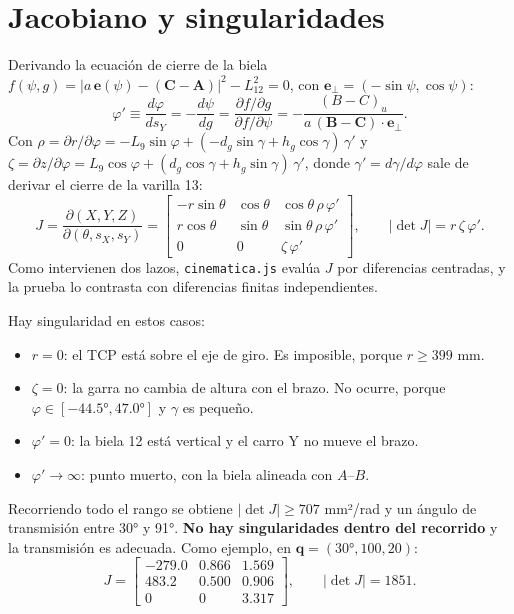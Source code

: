 \documentclass[a4paper,12pt]{article}
\newcommand{\codigo}[1]{\texttt{\small #1}}
\begin{document}
\section{Jacobiano y singularidades}

Derivando la ecuación de cierre de la biela $f(\psi, g) = |a\,\mathbf{e}(\psi) - (\mathbf{C}-\mathbf{A})|^2 - L_{12}^2 = 0$,
con $\mathbf{e}_\perp = (-\sin\psi, \cos\psi)$:
\begin{equation}
\varphi' \equiv \frac{d\varphi}{ds_Y} = -\frac{d\psi}{dg} = \frac{\partial f/\partial g}{\partial f/\partial\psi}
= -\frac{(B-C)_u}{a\,(\mathbf{B}-\mathbf{C})\cdot\mathbf{e}_\perp}.
\end{equation}
Con $\rho = \partial r/\partial\varphi = -L_9\sin\varphi + (-d_g\sin\gamma + h_g\cos\gamma)\,\gamma'$ y
$\zeta = \partial z/\partial\varphi = L_9\cos\varphi + (d_g\cos\gamma + h_g\sin\gamma)\,\gamma'$, donde
$\gamma' = d\gamma/d\varphi$ sale de derivar el cierre de la varilla 13:
\begin{equation}
J = \frac{\partial(X,Y,Z)}{\partial(\theta, s_X, s_Y)} =
\begin{bmatrix}
-r\sin\theta & \cos\theta & \cos\theta\, \rho\,\varphi'\\
 r\cos\theta & \sin\theta & \sin\theta\, \rho\,\varphi'\\
 0 & 0 & \zeta\,\varphi'
\end{bmatrix},\qquad
|\det J| = r\,\zeta\,\varphi' .
\end{equation}
Como intervienen dos lazos, \codigo{cinematica.js} evalúa $J$ por diferencias centradas, y la prueba lo
contrasta con diferencias finitas independientes.

Hay singularidad en estos casos:
\begin{itemize}
\item $r = 0$: el TCP está sobre el eje de giro. Es imposible, porque $r \ge 399$ mm.
\item $\zeta = 0$: la garra no cambia de altura con el brazo. No ocurre, porque $\varphi \in [-44.5°, 47.0°]$ y $\gamma$ es pequeño.
\item $\varphi' = 0$: la biela 12 está vertical y el carro Y no mueve el brazo.
\item $\varphi' \to \infty$: punto muerto, con la biela alineada con $A$--$B$.
\end{itemize}
Recorriendo todo el rango se obtiene $|\det J| \ge 707$ mm²/rad y un ángulo de transmisión entre 30° y
91°. \textbf{No hay singularidades dentro del recorrido} y la transmisión es adecuada. Como ejemplo, en
$\mathbf{q} = (30°, 100, 20)$:
\begin{equation}
J = \begin{bmatrix} -279.0 & 0.866 & 1.569\\ 483.2 & 0.500 & 0.906\\ 0 & 0 & 3.317\end{bmatrix},
\qquad |\det J| = 1851 .
\end{equation}
\end{document}
